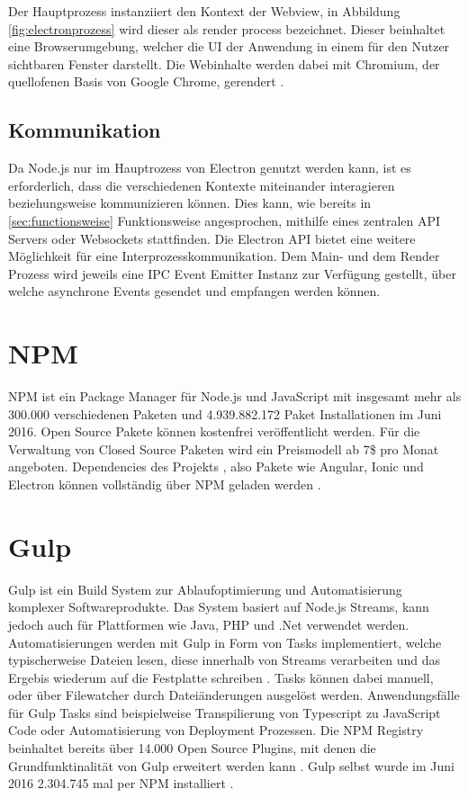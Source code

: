 Der Hauptprozess instanziiert den Kontext der Webview, in Abbildung \ref{fig:electronprozess} wird dieser als render process bezeichnet.
Dieser beinhaltet eine Browserumgebung, welcher die \ac{UI} der Anwendung in einem für den Nutzer sichtbaren Fenster darstellt.
Die Webinhalte werden dabei mit Chromium, der quellofenen Basis von Google Chrome, gerendert \cite{Build58:online}.

\subsection{Kommunikation}

Da Node.js nur im Hauptrozess von Electron genutzt werden kann, ist es erforderlich,
dass die verschiedenen Kontexte miteinander interagieren beziehungsweise kommunizieren können.
Dies kann, wie bereits in \ref{sec:functionsweise} Funktionsweise angesprochen,
mithilfe eines zentralen API Servers oder Websockets stattfinden.
Die Electron API bietet eine weitere Möglichkeit für eine Interprozesskommunikation.
Dem Main- und dem Render Prozess wird jeweils eine IPC Event Emitter Instanz zur Verfügung gestellt,
über welche asynchrone Events gesendet und empfangen werden können.

\section{\ac{NPM}}

\ac{NPM} ist ein Package Manager für Node.js und JavaScript mit insgesamt mehr als 300.000 verschiedenen Paketen und
4.939.882.172 Paket Installationen im Juni 2016.
Open Source Pakete können kostenfrei veröffentlicht werden.
Für die Verwaltung von Closed Source Paketen wird ein Preismodell ab 7\$ pro Monat angeboten.
Dependencies des Projekts \projectname{}, also Pakete wie Angular, Ionic und Electron können vollständig
über \ac{NPM} geladen werden \cite{npm31:online}.

\section{Gulp}

Gulp ist ein Build System zur Ablaufoptimierung und Automatisierung komplexer Softwareprodukte.
Das System basiert auf Node.js Streams, kann jedoch auch für Plattformen wie Java, PHP und .Net verwendet werden.
Automatisierungen werden mit Gulp in Form von Tasks implementiert,
welche typischerweise Dateien lesen, diese innerhalb von Streams verarbeiten und das Ergebis wiederum auf die
Festplatte schreiben \cite{gulpj46:online}.
Tasks können dabei manuell, oder über Filewatcher durch Dateiänderungen ausgelöst werden.
Anwendungsfälle für Gulp Tasks sind beispielweise Transpilierung von Typescript zu JavaScript Code oder
Automatisierung von Deployment Prozessen. Die \ac{NPM} Registry beinhaltet bereits über 14.000 Open Source Plugins,
mit denen die Grundfunktinalität von Gulp erweitert werden kann \cite{resul14:online}.
Gulp selbst wurde im Juni 2016 2.304.745 mal per NPM installiert \cite{gulp17:online}.
